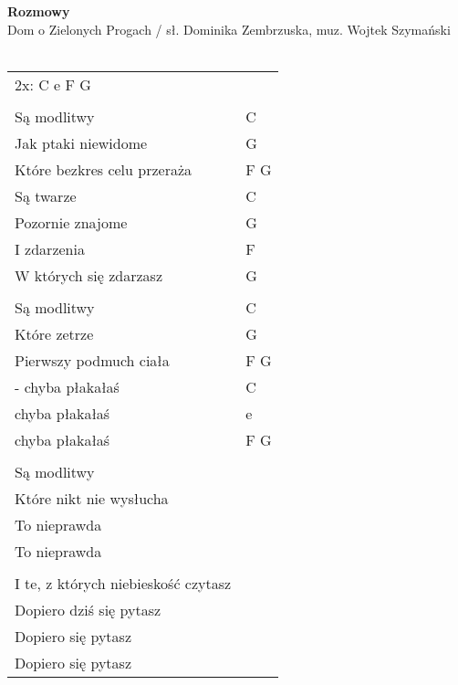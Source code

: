 \documentclass[a5paper]{article}
\begin{document}


\noindent
\fontsize{12pt}{15pt}\selectfont
\textbf{Rozmowy} \\
\fontsize{8pt}{10pt}\selectfont
Dom o Zielonych Progach / sł. Dominika Zembrzuska, muz. Wojtek Szymański \\ \\
\fontsize{10pt}{12pt}\selectfont
{}
\begin{tabular}{@{}p{6.50cm}p{3cm}@{}}
\noindent
2x: C e F G & \\ \\
Są modlitwy & C \\
Jak ptaki niewidome & G \\
Które bezkres celu przeraża & F G \\
Są twarze & C \\
Pozornie znajome & G \\
I zdarzenia & F \\
W których się zdarzasz & G \\ \\
Są modlitwy & C \\
Które zetrze & G \\
Pierwszy podmuch ciała & F G \\
- chyba płakałaś & C \\
\hspace{1cm}chyba płakałaś & e \\
\hspace{2cm}chyba płakałaś & F G \\ \\

Są modlitwy & \\
Które nikt nie wysłucha & \\
To nieprawda & \\
To nieprawda & \\ \\

I te, z których niebieskość czytasz & \\
Dopiero dziś się pytasz & \\
Dopiero się pytasz & \\
Dopiero się pytasz &
\end{tabular}
\end{document}
